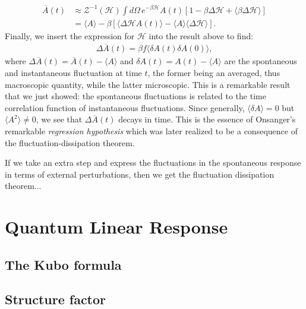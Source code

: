 \documentclass[reprint,
nofootinbib,
amsmath,amssymb,
aps]{revtex4-1}
\newcommand{\be}{\beta}
\newcommand{\f}[2]{\frac{#1}{#2}}
\newcommand{\lb}{\left[}
\newcommand{\rb}{\right]}
\begin{document}
\begin{align*}
\overline{A}(t) 
&\approx \mathcal{Z}^{-1}(\mathcal{H})  \int d\Omega \, e^{-\be \mathcal{H}} A(t)   \lb 1 - \be \Delta \mathcal{H}  + \langle  \be \Delta \mathcal{H}  \rangle  \rb \\ 
&= \langle A \rangle - \be \lb \langle \Delta \mathcal{H} A(t) \rangle - \langle A \rangle \langle \Delta \mathcal{H} \rangle  \rb.
\end{align*}
Finally, we insert the expression for $\mathcal{H}$ into the result above to find:
\begin{align*}
\Delta \overline{A}(t) = \be f \langle \delta A(t) \delta A(0) \rangle,
\end{align*}
where $\Delta \overline{A}(t) = \overline{A}(t) - \langle A \rangle$ and $\delta A(t) = A(t) - \langle A \rangle$ are the spontaneous and instantaneous fluctuation at time $t$, the former being an averaged, thus macroscopic quantity, while the latter microscopic. This is a remarkable result that we just showed: the spontaneous fluctuations is related to the time correlation function of instantaneous fluctuations. Since generally, $\langle \delta A \rangle = 0$ but $\langle A^2 \rangle \neq 0$, we see that $\Delta \overline{A}(t)$ decays in time. This is the essence of Onsanger's remarkable \textit{regression hypothesis} which was later realized to be a consequence of the fluctuation-dissipation theorem. 

If we take an extra step and express the fluctuations in the spontaneous response in terms of external perturbations, then we get the fluctuation dissipation theorem...

\section{Quantum Linear Response}





\subsection{The Kubo formula}

\subsection{Structure factor}
\end{document}
